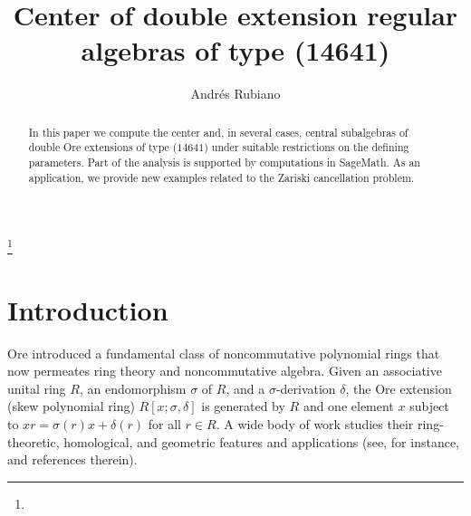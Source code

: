 \documentclass{amsart}
\theoremstyle{definition}
\theoremstyle{remark}
\numberwithin{equation}{section}
\begin{document}
\title[Center of double extension regular algebras of type (14641)]{Center of double extension regular algebras of type (14641)}



\author{Andr\'es Rubiano}
\address{Universidad ECCI}

\thanks{}



\date{}



\begin{abstract}
In this paper we compute the center and, in several cases, central subalgebras of double Ore extensions of type ($14641$) under suitable restrictions on the defining parameters. Part of the analysis is supported by computations in \textsf{SageMath}. As an application, we provide new examples related to the Zariski cancellation problem.
\end{abstract}

\maketitle


\section{Introduction}

Ore \cite{Ore1931, Ore1933} introduced a fundamental class of noncommutative polynomial rings that now permeates ring theory and noncommutative algebra. Given an associative unital ring $R$, an endomorphism $\sigma$ of $R$, and a $\sigma$-derivation $\delta$, the Ore extension (skew polynomial ring) $R[x;\sigma,\delta]$ is generated by $R$ and one element $x$ subject to $xr=\sigma(r)x+\delta(r)$ for all $r\in R$. A wide body of work studies their ring-theoretic, homological, and geometric features and applications (see, for instance, \cite{BrownGoodearl2002, BuesoTorrecillasVerschoren2003, Fajardoetal2020, Fajardoetal2024, GoodearlLetzter1994, GoodearlWarfield2004, McConnellRobson2001, Li2002, Rosenberg1995, SeilerBook2010} and references therein).
\end{document}
